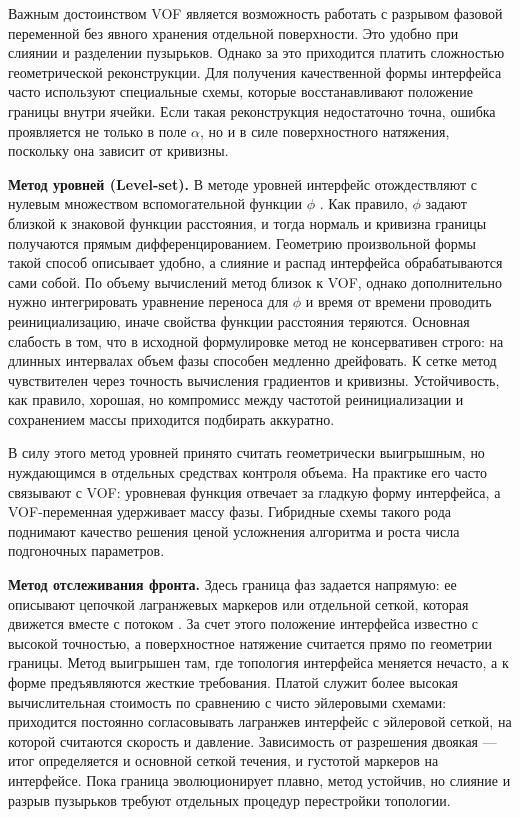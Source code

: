 Важным достоинством VOF является возможность работать с разрывом фазовой
переменной без явного хранения отдельной поверхности. Это удобно при слиянии и
разделении пузырьков. Однако за это приходится платить сложностью
геометрической реконструкции. Для получения качественной формы интерфейса часто
используют специальные схемы, которые восстанавливают положение границы внутри
ячейки. Если такая реконструкция недостаточно точна, ошибка проявляется не
только в поле \(\alpha\), но и в силе поверхностного натяжения, поскольку она
зависит от кривизны.

\textbf{Метод уровней (Level-set).}
В методе уровней интерфейс отождествляют с нулевым множеством вспомогательной
функции \(\phi\) \cite{Osher1988}. Как правило, \(\phi\) задают близкой к
знаковой функции расстояния, и тогда нормаль и кривизна границы получаются
прямым дифференцированием. Геометрию произвольной формы такой способ описывает
удобно, а слияние и распад интерфейса обрабатываются сами собой. По объему
вычислений метод близок к VOF, однако дополнительно нужно интегрировать
уравнение переноса для \(\phi\) и время от времени проводить реинициализацию,
иначе свойства функции расстояния теряются. Основная слабость в том, что в
исходной формулировке метод не консервативен строго: на длинных интервалах
объем фазы способен медленно дрейфовать. К сетке метод чувствителен через
точность вычисления градиентов и кривизны. Устойчивость, как правило, хорошая,
но компромисс между частотой реинициализации и сохранением массы приходится
подбирать аккуратно.

В силу этого метод уровней принято считать геометрически выигрышным, но
нуждающимся в отдельных средствах контроля объема. На практике его часто
связывают с VOF: уровневая функция отвечает за гладкую форму интерфейса, а
VOF-переменная удерживает массу фазы. Гибридные схемы такого рода поднимают
качество решения ценой усложнения алгоритма и роста числа подгоночных
параметров.

\textbf{Метод отслеживания фронта.}
Здесь граница фаз задается напрямую: ее описывают цепочкой лагранжевых
маркеров или отдельной сеткой, которая движется вместе с потоком
\cite{Tryggvason2001}. За счет этого положение интерфейса известно с высокой
точностью, а поверхностное натяжение считается прямо по геометрии границы.
Метод выигрышен там, где топология интерфейса меняется нечасто, а к форме
предъявляются жесткие требования. Платой служит более высокая вычислительная
стоимость по сравнению с чисто эйлеровыми схемами: приходится постоянно
согласовывать лагранжев интерфейс с эйлеровой сеткой, на которой считаются
скорость и давление. Зависимость от разрешения двоякая --- итог определяется и
основной сеткой течения, и густотой маркеров на интерфейсе. Пока граница
эволюционирует плавно, метод устойчив, но слияние и разрыв пузырьков требуют
отдельных процедур перестройки топологии.

